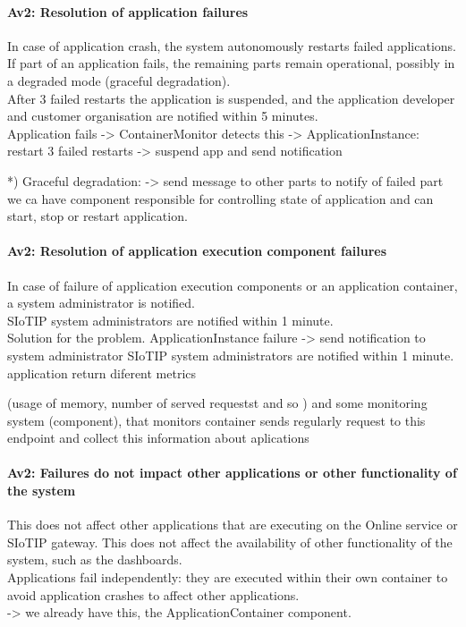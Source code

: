     \paragraph{Av2: Resolution of application failures}
        In case of application crash, the system autonomously restarts failed applications.
        If part of an application fails, the remaining parts remain operational,
        possibly in a degraded mode (graceful degradation). \\
        After 3 failed restarts the application is suspended, and the
        application developer and customer organisation are notified within 5 minutes.\\
        Application fails -> ContainerMonitor detects this -> ApplicationInstance: restart
        3 failed restarts -> suspend app and send notification

        *) Graceful degradation:
        -> send message to other parts to notify of failed part
        we ca have component responsible for controlling state of application
        and can start, stop or restart application. 
        
        

    \paragraph{Av2: Resolution of application execution component failures}
        In case of failure of application execution components or an application
        container, a system administrator is notified. \\
        SIoTIP system administrators are notified within 1 minute.\\
        Solution for the problem.
        ApplicationInstance failure -> send notification to system administrator
        SIoTIP system administrators are notified within 1 minute.
        application return diferent metrics 

        (usage of memory, number of served requestst and so ) and some monitoring 
        system (component), that monitors container sends regularly request to this endpoint 
        and  collect this information about aplications

    \paragraph{Av2: Failures do not impact other applications or other functionality of the system}
        This does not affect other applications that are executing on the Online
        service or SIoTIP gateway. This does not affect the availability of
        other functionality of the system, such as the dashboards. \\
        Applications fail independently: they are executed within their own
        container to avoid application crashes to affect other applications.\\
       -> we already have this, the ApplicationContainer component.

